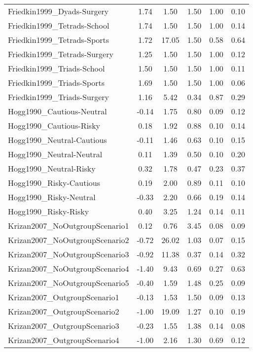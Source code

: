 \begin{longtable}{lccccc}
Friedkin1999\_Dyads-Surgery & 1.74 & 1.50 & 1.50 & 1.00 & 0.10\\
Friedkin1999\_Tetrads-School & 1.74 & 1.50 & 1.50 & 1.00 & 0.14\\
Friedkin1999\_Tetrads-Sports & 1.72 & 17.05 & 1.50 & 0.58 & 0.64\\
\addlinespace
Friedkin1999\_Tetrads-Surgery & 1.25 & 1.50 & 1.50 & 1.00 & 0.12\\
Friedkin1999\_Triads-School & 1.50 & 1.50 & 1.50 & 1.00 & 0.11\\
Friedkin1999\_Triads-Sports & 1.69 & 1.50 & 1.50 & 1.00 & 0.06\\
Friedkin1999\_Triads-Surgery & 1.16 & 5.42 & 0.34 & 0.87 & 0.29\\
Hogg1990\_Cautious-Neutral & -0.14 & 1.75 & 0.80 & 0.09 & 0.12\\
\addlinespace
Hogg1990\_Cautious-Risky & 0.18 & 1.92 & 0.88 & 0.10 & 0.14\\
Hogg1990\_Neutral-Cautious & -0.11 & 1.46 & 0.63 & 0.10 & 0.15\\
Hogg1990\_Neutral-Neutral & 0.11 & 1.39 & 0.50 & 0.10 & 0.20\\
Hogg1990\_Neutral-Risky & 0.32 & 1.78 & 0.47 & 0.23 & 0.37\\
Hogg1990\_Risky-Cautious & 0.19 & 2.00 & 0.89 & 0.11 & 0.10\\
\addlinespace
Hogg1990\_Risky-Neutral & -0.33 & 2.20 & 0.66 & 0.19 & 0.14\\
Hogg1990\_Risky-Risky & 0.40 & 3.25 & 1.24 & 0.14 & 0.11\\
Krizan2007\_NoOutgroupScenario1 & 0.12 & 0.76 & 3.45 & 0.08 & 0.09\\
Krizan2007\_NoOutgroupScenario2 & -0.72 & 26.02 & 1.03 & 0.07 & 0.15\\
Krizan2007\_NoOutgroupScenario3 & -0.92 & 11.38 & 0.37 & 0.14 & 0.32\\
\addlinespace
Krizan2007\_NoOutgroupScenario4 & -1.40 & 9.43 & 0.69 & 0.27 & 0.63\\
Krizan2007\_NoOutgroupScenario5 & -0.40 & 1.59 & 1.48 & 0.25 & 0.09\\
Krizan2007\_OutgroupScenario1 & -0.13 & 1.53 & 1.50 & 0.09 & 0.13\\
Krizan2007\_OutgroupScenario2 & -1.00 & 19.09 & 1.27 & 0.10 & 0.19\\
Krizan2007\_OutgroupScenario3 & -0.23 & 1.55 & 1.38 & 0.14 & 0.08\\
\addlinespace
Krizan2007\_OutgroupScenario4 & -1.00 & 2.16 & 1.30 & 0.69 & 0.12\\

\end{longtable}
